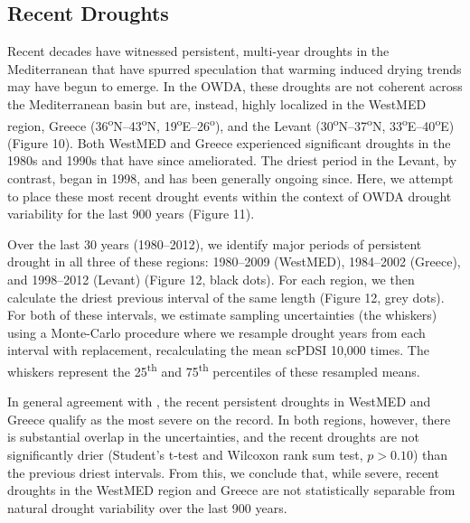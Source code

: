 \documentclass[draft,jgr]{AGUTeX}
\begin{document}
\begin{article}
\subsection{Recent Droughts}
\noindent Recent decades have witnessed persistent, multi-year droughts in the Mediterranean that have spurred speculation that warming induced drying trends may have begun to emerge. In the OWDA, these droughts are not coherent across the Mediterranean basin but are, instead, highly localized in the WestMED region, Greece (36\textsuperscript{o}N--43\textsuperscript{o}N, 19\textsuperscript{o}E--26\textsuperscript{o}), and the Levant (30\textsuperscript{o}N--37\textsuperscript{o}N, 33\textsuperscript{o}E--40\textsuperscript{o}E) (Figure 10). Both WestMED and Greece experienced significant droughts in the 1980s and 1990s that have since ameliorated. The driest period in the Levant, by contrast, began in 1998, and has been generally ongoing since. Here, we attempt to place these most recent drought events within the context of OWDA drought variability for the last 900 years (Figure 11).

\indent Over the last 30 years (1980--2012), we identify major periods of persistent drought in all three of these regions: 1980--2009 (WestMED), 1984--2002 (Greece), and 1998--2012 (Levant) (Figure 12, black dots). For each region, we then calculate the driest previous interval of the same length (Figure 12, grey dots). For both of these intervals, we estimate sampling uncertainties (the whiskers) using a Monte-Carlo procedure where we resample drought years from each interval with replacement, recalculating the mean scPDSI 10,000 times. The whiskers represent the 25\textsuperscript{th} and 75\textsuperscript{th} percentiles of these resampled means.

\indent In general agreement with \citet{Touchan:etal2008a}, the recent persistent droughts in WestMED and Greece qualify as the most severe on the record. In both regions, however, there is substantial overlap in the uncertainties, and the recent droughts are not significantly drier (Student's t-test and Wilcoxon rank sum test, $p>0.10$) than the previous driest intervals. From this, we conclude that, while severe, recent droughts in the WestMED region and Greece are not statistically separable from natural drought variability over the last 900 years.


\end{article}
\end{document}
